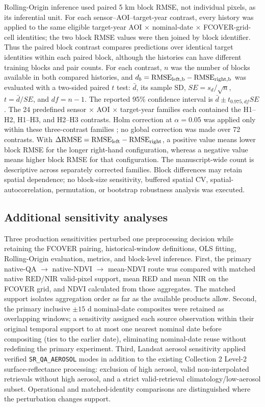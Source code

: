 Rolling-Origin inference used paired 5 km block RMSE, not individual pixels, as its inferential unit. For each sensor--AOI--target-year contrast, every history was applied to the same eligible target-year AOI $\times$ nominal-date $\times$ FCOVER-grid-cell identities; the two block RMSE values were then joined by block identifier. Thus the paired block contrast compares predictions over identical target identities within each paired block, although the histories can have different training blocks and pair counts. For each contrast, $n$ was the number of blocks available in both compared histories, and $d_b=\mathrm{RMSE}_{\rm left,b}-\mathrm{RMSE}_{\rm right,b}$ was evaluated with a two-sided paired $t$ test: $\bar d$, its sample SD, $SE=s_d/\sqrt n$, $t=\bar d/SE$, and $df=n-1$. The reported 95\% confidence interval is $\bar d\pm t_{0.975,df}SE$. The 24 predefined sensor $\times$ AOI $\times$ target-year families each contained the H1--H2, H1--H3, and H2--H3 contrasts. Holm correction at $\alpha=0.05$ was applied only within these three-contrast families \citep{holm1979}; no global correction was made over 72 contrasts. With $\Delta\mathrm{RMSE}=\mathrm{RMSE}_{\rm left}-\mathrm{RMSE}_{\rm right}$, a positive value means lower block RMSE for the longer right-hand configuration, whereas a negative value means higher block RMSE for that configuration. The manuscript-wide count is descriptive across separately corrected families. Block differences may retain spatial dependence; no block-size sensitivity, buffered spatial CV, spatial-autocorrelation, permutation, or bootstrap robustness analysis was executed.

\subsection{Additional sensitivity analyses}
Three production sensitivities perturbed one preprocessing decision while retaining the FCOVER pairing, historical-window definitions, OLS fitting, Rolling-Origin evaluation, metrics, and block-level inference. First, the primary native-QA $\rightarrow$ native-NDVI $\rightarrow$ mean-NDVI route was compared with matched native RED/NIR valid-pixel support, mean RED and mean NIR on the FCOVER grid, and NDVI calculated from those aggregates. The matched support isolates aggregation order as far as the available products allow. Second, the primary inclusive $\pm15$ d nominal-date composites were retained as overlapping windows; a sensitivity assigned each source observation within their original temporal support to at most one nearest nominal date before compositing (ties to the earlier date), eliminating nominal-date reuse without redefining the primary experiment. Third, Landsat aerosol sensitivity applied verified \texttt{SR\_QA\_AEROSOL} modes in addition to the existing Collection 2 Level-2 surface-reflectance processing: exclusion of high aerosol, valid non-interpolated retrievals without high aerosol, and a strict valid-retrieval climatology/low-aerosol subset. Operational and matched-identity comparisons are distinguished where the perturbation changes support.
